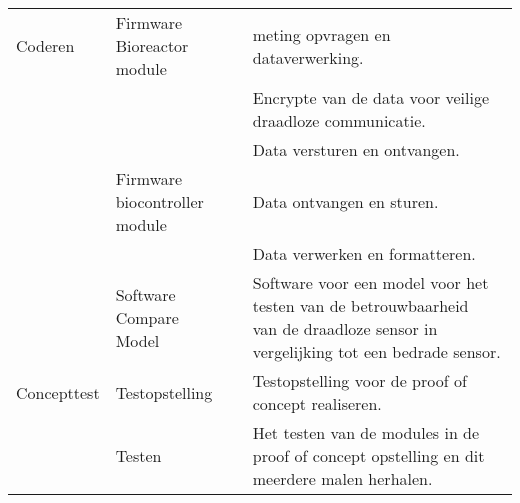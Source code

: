 \begin{table}[H]
{\begin{tabular}{lll}
		 Coderen &\makecell[l]{ Firmware Bioreactor\\ module} & meting opvragen en dataverwerking. \\
		 & & Encrypte van de data voor veilige draadloze communicatie. \\
		 & & Data versturen en ontvangen.\\
		 & \makecell[l]{Firmware biocontroller\\ module} & Data ontvangen en sturen. \\
		 & & Data verwerken en formatteren. \\
		 & \makecell[l]{Software Compare\\ Model} &\makecell[l]{Software voor een model voor het testen van de betrouwbaarheid\\ van de draadloze sensor in vergelijking tot een bedrade sensor.} \\
		  \midrule
		  
		 Concepttest & Testopstelling & Testopstelling voor de proof of concept realiseren.\\
		 & Testen &\makecell[l]{Het testen van de modules in de proof of concept opstelling en dit\\ meerdere malen herhalen.} \\ 
		 		 
		\bottomrule
	\end{tabular}}
\end{table} 